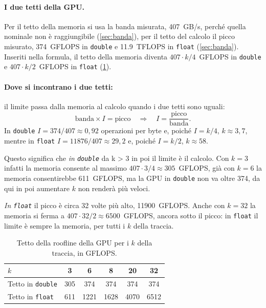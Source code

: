\documentclass[11pt,a4paper]{article}
\begin{document}
\paragraph{I due tetti della GPU.} Per il tetto della memoria si usa la banda
misurata, \SI{407}{GB/s}, perché quella nominale non è raggiungibile
(\cref{sec:banda}), per il tetto del calcolo il picco misurato,
\SI{374}{GFLOPS} in \texttt{double} e \SI{11.9}{TFLOPS} in \texttt{float}
(\cref{sec:banda}). Inseriti nella
formula, il tetto della memoria diventa $407 \cdot k/4 $~GFLOPS in
\texttt{double} e $407 \cdot k/2$~GFLOPS in \texttt{float} (\cref{tab:tetti}).

\paragraph{Dove si incontrano i due tetti:} il limite passa dalla memoria al
calcolo quando i due tetti sono uguali:
\[
  \text{banda} \times I = \text{picco}
  \quad\Rightarrow\quad
  I = \frac{\text{picco}}{\text{banda}} .
\]
In \texttt{double}
$I = 374/407 \approx 0{,}92$ operazioni per byte e, poiché $I = k/4$,
$k \approx 3{,}7$, mentre in \texttt{float} $I = \num{11876}/407 \approx 29{,}2$ e,
poiché $I = k/2$, $k \approx 58$.

Questo significa che \emph{in \texttt{double}} da k > 3 in poi il limite è il calcolo.
Con $k = 3$ infatti la memoria consente al massimo
$407 \cdot 3/4 \approx 305$~GFLOPS, già con $k = 6$ la memoria consentirebbe 611~GFLOPS,
ma la GPU in \texttt{double} non va oltre 374, da qui in poi aumentare $k$ non renderà più veloci.

\emph{In \texttt{float}} il picco è circa 32 volte più alto, \num{11900}~GFLOPS. Anche
con $k = 32$ la memoria si ferma a $407 \cdot 32/2 \approx 6500$~GFLOPS, ancora
sotto il picco: in \texttt{float} il limite è sempre la memoria, per tutti i
$k$ della traccia.

\begin{table}[H]
  \centering
  \caption{Tetto della roofline della GPU per i $k$ della traccia, in GFLOPS.}\label{tab:tetti}
  \begin{tabular}{lccccc}
    \toprule
    $k$ & 3 & 6 & 8 & 20 & 32 \\
    \midrule
    Tetto in \texttt{double} & 305 & 374 & 374 & 374 & 374 \\
    Tetto in \texttt{float}  & 611 & 1221 & 1628 & 4070 & 6512 \\
    \bottomrule
  \end{tabular}
\end{table}
\end{document}
